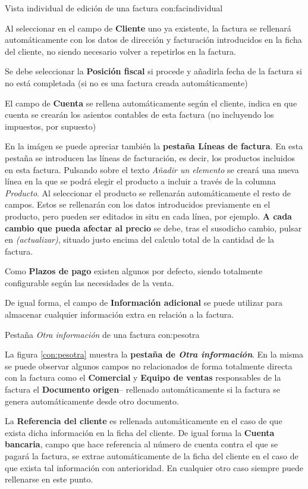 {Vista individual de edición de una factura}
{con:facindividual}

Al seleccionar en el campo de \textbf{Cliente} uno ya existente, la factura se rellenará automáticamente con los datos de dirección y facturación introducidos en la ficha del cliente, no siendo necesario volver a repetirlos en la factura.

Se debe seleccionar la \textbf{Posición fiscal} si procede y añadirla fecha de la factura si no está completada (si no es una factura creada
automáticamente)

El campo de \textbf{Cuenta} se rellena automáticamente según el cliente, indica en que cuenta se crearán los asientos contables de esta factura  (no incluyendo los impuestos, por supuesto)

En la imágen se puede apreciar también la \textbf{pestaña Líneas de factura}. En esta pestaña se introducen las líneas de facturación, es decir, los productos incluidos en esta factura. Pulsando sobre el texto \emph{Añadir un elemento} se creará una nueva línea en la que se podrá elegir el producto a incluir a través de la columna \emph{Producto}. Al seleccionar el producto se rellenarán automáticamente el resto de campos. Estos se rellenarán con los datos introducidos previamente en el producto, pero pueden ser editados in situ en cada línea, por ejemplo. \textbf{A cada cambio que pueda afectar al precio} se debe, tras el susodicho cambio, pulsar en \emph{(actualizar)}, situado justo encima del calculo total de la cantidad de la factura.

Como \textbf{Plazos de pago} existen algunos por defecto, siendo totalmente configurable según las necesidades de la venta.

De igual forma, el campo de \textbf{Información adicional} se puede utilizar para almacenar cualquier información extra en relación a la factura.


{Pestaña \emph{Otra información} de una factura}
{con:pesotra}

La figura \ref{con:pesotra} muestra la \textbf{pestaña de \emph{Otra información}}. En la misma se puede observar algunos campos no relacionados de forma totalmente directa con la factura como el \textbf{Comercial} y \textbf{Equipo de ventas} responsables de la factura   el \textbf{Documento origen}-- rellenado automáticamente si la factura se genera automáticamente desde otro documento.

La \textbf{Referencia del cliente} es rellenada automáticamente en el caso de que exista dicha información en la ficha del cliente. De igual forma la \textbf{Cuenta bancaria}, campo que hace referencia al número de cuenta contra el que se pagará la factura, se extrae automáticamente de la ficha del cliente en el caso de que exista tal información con anterioridad. En cualquier otro caso siempre puede rellenarse en este punto.


